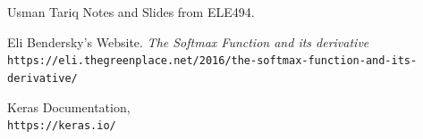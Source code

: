 \documentclass[a4paper, 12pt]{article}
\begin{document}
    \pagebreak

    \begin{thebibliography}{9}
        Usman Tariq Notes and Slides from ELE494. 
        
        Eli Bendersky's Website. 
        \textit{The Softmax Function and its derivative}
        \\\texttt{https://eli.thegreenplace.net/2016/the-softmax-function-and-its-derivative/}
        
        Keras Documentation,
        \\\texttt{https://keras.io/}
    \end{thebibliography}
\end{document}

